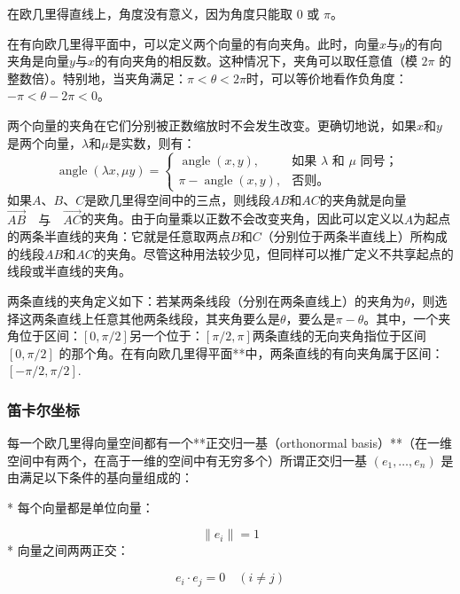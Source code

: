 在欧几里得直线上，角度没有意义，因为角度只能取 $0$ 或 $\pi$。

在有向欧几里得平面中，可以定义两个向量的有向夹角。此时，向量$x$与$y$的有向夹角是向量$y$与$x$的有向夹角的相反数。这种情况下，夹角可以取任意值（模 $2\pi$ 的整数倍）。特别地，当夹角满足：$\pi < \theta < 2\pi$时，可以等价地看作负角度：$-\pi < \theta - 2\pi < 0$。

两个向量的夹角在它们分别被正数缩放时不会发生改变。更确切地说，如果$x$和$y$是两个向量，$\lambda$和$\mu$是实数，则有：
$$
\operatorname{angle}(\lambda x, \mu y) =
\begin{cases}
\operatorname{angle}(x, y), & \text{如果 } \lambda \text{ 和 } \mu \text{ 同号；} \\[6pt]
\pi - \operatorname{angle}(x, y), & \text{否则。}
\end{cases}~
$$
如果$A$、$B$、$C$是欧几里得空间中的三点，则线段$AB$和$AC$的夹角就是向量$\overrightarrow{AB} \quad \text{与} \quad \overrightarrow{AC}$的夹角。由于向量乘以正数不会改变夹角，因此可以定义以$A$为起点的两条半直线的夹角：它就是任意取两点$B$和$C$（分别位于两条半直线上）所构成的线段$AB$和$AC$的夹角。尽管这种用法较少见，但同样可以推广定义不共享起点的线段或半直线的夹角。

两条直线的夹角定义如下：若某两条线段（分别在两条直线上）的夹角为$\theta$，则选择这两条直线上任意其他两条线段，其夹角要么是$\theta$，要么是$\pi - \theta$。其中，一个夹角位于区间：$[0, \pi/2]$另一个位于：$[\pi/2, \pi]$两条直线的无向夹角指位于区间 $[0, \pi/2]$ 的那个角。在有向欧几里得平面**中，两条直线的有向夹角属于区间：$[-\pi/2, \pi/2]$.
\subsubsection{笛卡尔坐标}
每一个欧几里得向量空间都有一个**正交归一基（orthonormal basis）**（在一维空间中有两个，在高于一维的空间中有无穷多个）所谓正交归一基 $(e_1, \dots, e_n)$ 是由满足以下条件的基向量组成的：

* 每个向量都是单位向量：

  $$
  \|e_i\| = 1
  $$
* 向量之间两两正交：

  $$
  e_i \cdot e_j = 0 \quad (i \ne j)
  $$

